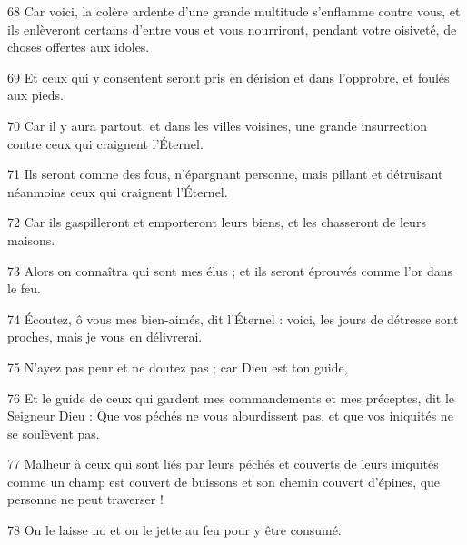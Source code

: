\par 68 Car voici, la colère ardente d'une grande multitude s'enflamme contre vous, et ils enlèveront certains d'entre vous et vous nourriront, pendant votre oisiveté, de choses offertes aux idoles.
\par 69 Et ceux qui y consentent seront pris en dérision et dans l'opprobre, et foulés aux pieds.
\par 70 Car il y aura partout, et dans les villes voisines, une grande insurrection contre ceux qui craignent l'Éternel.
\par 71 Ils seront comme des fous, n'épargnant personne, mais pillant et détruisant néanmoins ceux qui craignent l'Éternel.
\par 72 Car ils gaspilleront et emporteront leurs biens, et les chasseront de leurs maisons.
\par 73 Alors on connaîtra qui sont mes élus ; et ils seront éprouvés comme l'or dans le feu.
\par 74 Écoutez, ô vous mes bien-aimés, dit l'Éternel : voici, les jours de détresse sont proches, mais je vous en délivrerai.
\par 75 N'ayez pas peur et ne doutez pas ; car Dieu est ton guide,
\par 76 Et le guide de ceux qui gardent mes commandements et mes préceptes, dit le Seigneur Dieu : Que vos péchés ne vous alourdissent pas, et que vos iniquités ne se soulèvent pas.
\par 77 Malheur à ceux qui sont liés par leurs péchés et couverts de leurs iniquités comme un champ est couvert de buissons et son chemin couvert d'épines, que personne ne peut traverser !
\par 78 On le laisse nu et on le jette au feu pour y être consumé.

